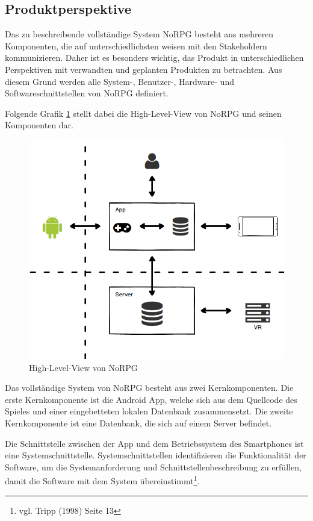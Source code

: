 	\subsection{Produktperspektive}
		Das zu beschreibende vollständige System NoRPG besteht aus mehreren Komponenten, die auf unterschiedlichsten weisen mit den Stakeholdern kommunizieren. Daher ist es besonders wichtig, das Produkt in unterschiedlichen Perspektiven mit verwandten und geplanten Produkten zu betrachten. Aus diesem Grund werden alle System-, Benutzer-, Hardware- und Softwareschnittstellen von NoRPG definiert. 
		
		Folgende Grafik \ref{highlevelview} stellt dabei die High-Level-View von NoRPG und seinen Komponenten dar.

		\begin{figure}[htbp]
			\centering 
			\label{highlevelview}
			\includegraphics[width=12cm]{pics/HighLevelView.png}
			\caption{High-Level-View von NoRPG}
		\end{figure}
		
		Das vollständige System von NoRPG besteht aus zwei Kernkomponenten. Die erste Kernkomponente ist die Android App, welche sich aus dem Quellcode des Spieles und einer eingebetteten lokalen Datenbank zusammensetzt. Die zweite Kernkomponente ist eine Datenbank, die sich auf einem Server befindet.
		
		Die Schnittstelle zwischen der App und dem Betriebssystem des Smartphones ist eine Systemschnittstelle. Systemschnittstellen identifizieren die Funktionalität der Software, um die Systemanforderung und Schnittstellenbeschreibung zu erfüllen, damit die Software mit dem System übereinstimmt\footnote{vgl. Tripp \cite{srsIEEE}(1998) Seite 13}.
		

